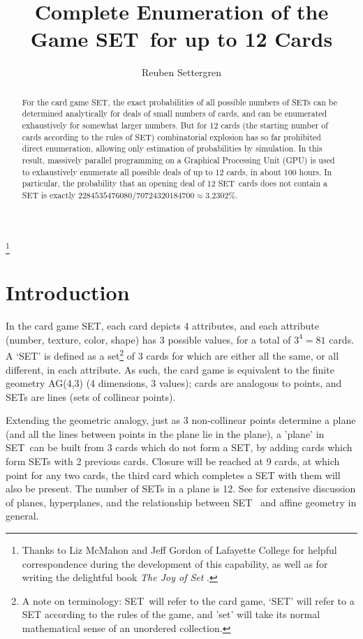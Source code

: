 \documentclass[10pt]{amsart}
\newcommand{\SETb}{SET\texttrademark\ } %
\newcommand{\SET}{SET\texttrademark}  %
\begin{document}
\title[SET Enumeration]{Complete Enumeration of the Game \SETb for up to 12 Cards}
\author[Settergren]{Reuben Settergren}

\thanks{Thanks to Liz McMahon and Jeff Gordon of Lafayette College for helpful
  correspondence during the development of this capability, as well as for
  writing the delightful book {\em The Joy of Set} \cite{JOS}.}

\maketitle

\begin{abstract}
For the card game \SET, the exact probabilities of all possible numbers of SETs
can be determined analytically for deals of small numbers of cards, and can be
enumerated exhaustively for somewhat larger numbers. But for 12 cards (the
starting number of cards according to the rules of \SET) combinatorial explosion
has so far prohibited direct enumeration, allowing only estimation of
probabilities by simulation. In this result, massively parallel programming on a
Graphical Processing Unit (GPU) is used to exhaustively enumerate all possible
deals of up to 12 cards, in about 100 hours. In particular, the probability that
an opening deal of 12 \SETb cards does not contain a SET is exactly
$2284535476080/70724320184700 \approx 3.2302\%$.
\end{abstract}

\section{Introduction}
In the card game \SET\cite{SET}, each card depicts 4 attributes, and each
attribute (number, texture, color, shape) has 3 possible values, for a total of
$3^4=81$ cards. A `SET' is defined as a set\footnote{A note on terminology:
  \SETb will refer to the card game, `SET' will refer to a SET according to the
  rules of the game, and 'set' will take its normal mathematical sense of an
  unordered collection.} of 3 cards for which are either all the same, or all
different, in each attribute. As such, the card game is equivalent to the finite
geometry AG(4,3) (4 dimensions, 3 values); cards are analogous to points, and
SETs are lines (sets of collinear points).

Extending the geometric analogy, just as 3 non-collinear points determine a
plane (and all the lines between points in the plane lie in the plane), a
'plane' in \SETb can be built from 3 cards which do not form a SET, by adding
cards which form SETs with 2 previous cards. Closure will be reached at 9 cards,
at which point for any two cards, the third card which completes a SET with them
will also be present. The number of SETs in a plane is 12. See \cite{JOS} for
extensive discussion of planes, hyperplanes, and the relationship between \SETb
and affine geometry in general.
\end{document}
